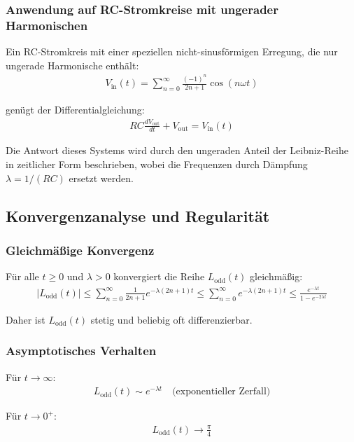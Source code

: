 \documentclass[a4paper, 12pt, twoside, openright]{report}
\theoremstyle{definition}
\theoremstyle{definition}
\begin{document}
\subsubsection*{Anwendung auf RC-Stromkreise mit ungerader Harmonischen}

Ein RC-Stromkreis mit einer speziellen nicht-sinusförmigen Erregung, die nur ungerade Harmonische enthält:
\begin{align}
	V_{\text{in}}(t) = \sum_{n=0}^{\infty} \frac{(-1)^n}{2n+1} \cos(n\omega t)
\end{align}

genügt der Differentialgleichung:
\begin{align}
	RC \frac{dV_{\text{out}}}{dt} + V_{\text{out}} = V_{\text{in}}(t)
\end{align}

Die Antwort dieses Systems wird durch den ungeraden Anteil der Leibniz-Reihe in zeitlicher Form beschrieben, wobei die Frequenzen durch Dämpfung $\lambda = 1/(RC)$ ersetzt werden.

\subsection{Konvergenzanalyse und Regularität}

\subsubsection*{Gleichmäßige Konvergenz}

Für alle $t \geq 0$ und $\lambda > 0$ konvergiert die Reihe $L_{\text{odd}}(t)$ gleichmäßig:
\begin{align}
	|L_{\text{odd}}(t)| \leq \sum_{n=0}^{\infty} \frac{1}{2n+1} e^{-\lambda(2n+1)t} \leq \sum_{n=0}^{\infty} e^{-\lambda(2n+1)t} \leq \frac{e^{-\lambda t}}{1 - e^{-2\lambda t}}
\end{align}

Daher ist $L_{\text{odd}}(t)$ stetig und beliebig oft differenzierbar.

\subsubsection*{Asymptotisches Verhalten}

Für $t \to \infty$:
\begin{align}
	L_{\text{odd}}(t) \sim e^{-\lambda t} \quad \text{(exponentieller Zerfall)}
\end{align}

Für $t \to 0^+$:
\begin{align}
	L_{\text{odd}}(t) \to \frac{\pi}{4}
\end{align}
\end{document}
